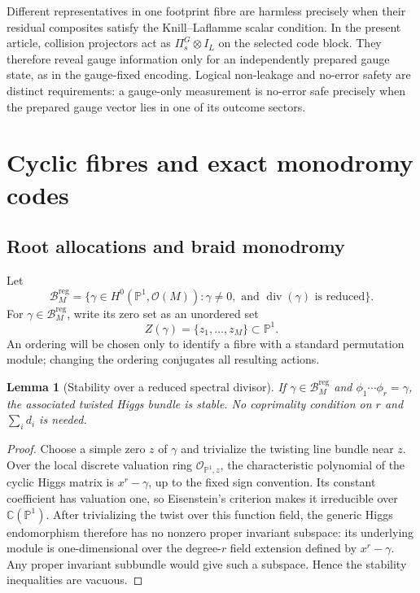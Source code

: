 \documentclass[11pt]{article}
\newtheorem{lemma}[theorem]{Lemma}
\theoremstyle{definition}
\theoremstyle{remark}
\newcommand{\C}{\mathbb C}
\newcommand{\Pp}{\mathbb P}
\newcommand{\cB}{\mathcal B}
\newcommand{\cO}{\mathcal O}
\newcommand{\reg}{\mathrm{reg}}
\begin{document}
Different representatives in one footprint fibre are harmless precisely when their residual composites satisfy the Knill--Laflamme scalar condition.  In the present article, collision projectors act as $\Pi_s^G\otimes I_L$ on the selected code block.  They therefore reveal gauge information only for an independently prepared gauge state, as in the gauge-fixed encoding.  Logical non-leakage and no-error safety are distinct requirements: a gauge-only measurement is no-error safe precisely when the prepared gauge vector lies in one of its outcome sectors.

\section{Cyclic fibres and exact monodromy codes}\label{sec:cyclic-fibres}\label{sec:codes}

\subsection{Root allocations and braid monodromy}

Let
\begin{equation}\label{eq:regular-base}
 \cB_M^{\reg}
 =\{\gamma\in H^0(\Pp^1,\cO(M)):\gamma\neq0,
       \text{ and }\operatorname{div}(\gamma)\text{ is reduced}\}.
\end{equation}
For $\gamma\in\cB_M^{\reg}$, write its zero set as an unordered set
\[
 Z(\gamma)=\{z_1,\ldots,z_M\}\subset\Pp^1.
\]
An ordering will be chosen only to identify a fibre with a standard permutation module; changing the ordering conjugates all resulting actions.

\begin{lemma}[Stability over a reduced spectral divisor]\label{lem:regular-cyclic-stability}
If $\gamma\in\cB_M^{\reg}$ and $\phi_1\cdots\phi_r=\gamma$, the associated twisted Higgs bundle is stable.  No coprimality condition on $r$ and $\sum_i d_i$ is needed.
\end{lemma}

\begin{proof}
Choose a simple zero $z$ of $\gamma$ and trivialize the twisting line bundle near $z$.  Over the local discrete valuation ring $\cO_{\Pp^1,z}$, the characteristic polynomial of the cyclic Higgs matrix is $x^r-\gamma$, up to the fixed sign convention.  Its constant coefficient has valuation one, so Eisenstein's criterion makes it irreducible over $\C(\Pp^1)$.  After trivializing the twist over this function field, the generic Higgs endomorphism therefore has no nonzero proper invariant subspace: its underlying module is one-dimensional over the degree-$r$ field extension defined by $x^r-\gamma$.  Any proper invariant subbundle would give such a subspace.  Hence the stability inequalities are vacuous.
\end{proof}
\end{document}
